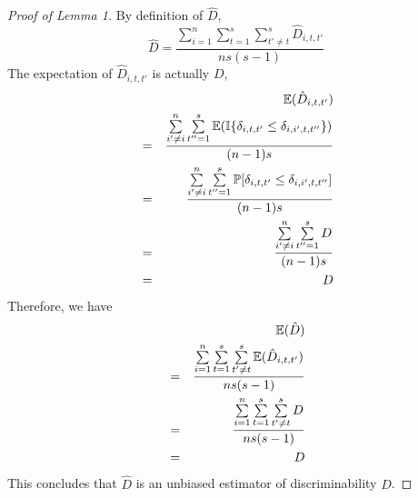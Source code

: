 \documentclass{article}
\begin{document}
\begin{proof}[Proof of Lemma 1]
	By definition of $\hat{D}$,
	\[\hat{D}= \frac{\sum\limits_{i=1}^{n} \sum\limits_{t=1}^{s}  \sum\limits_{t'\neq t}^{s} \hat{D}_{i,t,t'}}{ns(s-1)}\]
	The expectation of $\hat{D}_{i,t,t'}$ is actually $D$,
	\begin{eqnarray*}  
		& &\mathbb{E}(\hat{D}_{i,t,t'}) \\
		&=&\frac{\sum\limits_{i' \neq i}^{n} \sum\limits_{t''=1}^{s} 		    	 \mathbb{E}(\mathbb{I}\{\delta_{i,t,t'} \leq \delta_{i,i',t,t''} \}) }{(n-1)s} \\
		&=&\frac{\sum\limits_{i' \neq i}^{n} \sum\limits_{t''=1}^{s} 
		     	\mathbb{P}[\delta_{i,t,t'} \leq \delta_{i,i',t,t''}]}{(n-1)s} \\
		&=& \frac{\sum\limits_{i' \neq i}^{n} \sum\limits_{t''=1}^{s} 
			D}{(n-1)s} \\
		&=& D
	\end{eqnarray*}
	Therefore, we have
	\begin{eqnarray*}
		& &\mathbb{E}(\hat{D})\\
		&=&\frac{\sum\limits_{i=1}^{n} \sum\limits_{t=1}^{s}  \sum\limits_{t'\neq t}^{s} \mathbb{E}(\hat{D}_{i,t,t'})}{ns(s-1)} \\
		&=&\frac{\sum\limits_{i=1}^{n} \sum\limits_{t=1}^{s}  \sum\limits_{t'\neq t}^{s} D}{ns(s-1)} \\
		&=& D
	\end{eqnarray*}
	This concludes that $\hat{D}$ is an unbiased estimator of discriminability $D$.
\end{proof}
\end{document}
